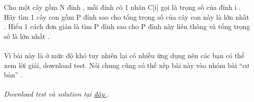 Cho một cây gồm N đỉnh , mỗi đỉnh có 1 nhãn C[i] gọi là trọng số của đỉnh i . Hãy tìm 1 cây con gồm P đỉnh sao cho tổng trọng số của cây con này là lớn nhất . Hiểu 1 cách đơn giản là tìm P đỉnh sao cho P đỉnh này liên thông và tổng trọng số là lớn nhất .   
\\
\\       Vì bài này là ở mức độ khó tuy nhiên lại có nhiều ứng dụng nên các bạn có thể xem lời giải, download test. Nói chung cũng có thể xếp bài này vào nhóm bài “cơ bản” .      
\\
\\\textit{    Download test và solution tại    \href{http://vn.spoj.pl/content/ptree.rar}{     đây    }    .   }